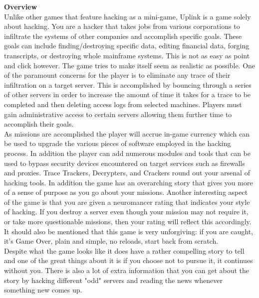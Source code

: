 \documentclass[11pt,twoside,a4paper]{book}
\begin{document}
{\textbf{Overview}~\\
Unlike other games that feature hacking as a mini-game, Uplink is a game solely about hacking. You are a hacker that takes jobs from various corporations to infiltrate the systems of other companies and accomplish specific goals. These goals can include finding/destroying specific data, editing financial data, forging transcripts, or destroying whole mainframe systems. This is not as easy as point and click however. The game tries to make itself seem as realistic as possible. One of the paramount concerns for the player is to eliminate any trace of their infiltration on a target server. This is accomplished by bouncing through a series of other servers in order to increase the amount of time it takes for a trace to be completed and then deleting access logs from selected machines. Players must gain administrative access to certain servers allowing them further time to accomplish their goals. ~\\
As missions are accomplished the player will accrue in-game currency which can be used to upgrade the various pieces of software employed in the hacking process. In addition the player can add numerous modules and tools that can be used to bypass security devices encountered on target services such as firewalls and proxies. Trace Trackers, Decrypters, and Crackers round out your arsenal of hacking tools. In addition the game has an overarching story that gives you more of a sense of purpose as you go about your missions. Another interesting aspect of the game is that you are given a neuromancer rating that indicates your style of hacking. If you destroy a server even though your mission may not require it, or take more questionable missions, then your rating will reflect this accordingly. It should also be mentioned that this game is very unforgiving: if you are caught, it's Game Over, plain and simple, no reloads, start back from scratch. ~\\
Despite what the game looks like it does have a rather compelling story to tell and one of the great things about it is if you choose not to pursue it, it continues without you. There is also a lot of extra information that you can get about the story by hacking different "odd" servers and reading the news whenever something new comes up. ~\\

}
\end{document}
